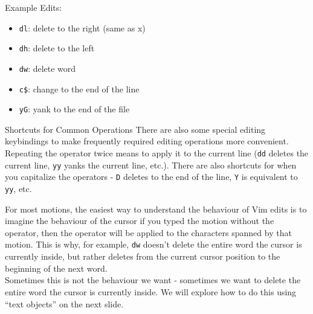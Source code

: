 \documentclass{beamer}
\begin{document}
\begin{frame}[fragile]
    Example Edits:
    \begin{itemize}
	\item \verb+dl+:  delete to the right (same as x)
	\item \verb+dh+:  delete to the left
	\item \verb+dw+:  delete word
	\item \verb+c$+:  change to the end of the line
	\item \verb+yG+:  yank to the end of the file
    \end{itemize}
\end{frame}

\begin{frame}[fragile]
    \begin{block}{Shortcuts for Common Operations}
	There are also some special editing keybindings to make frequently required editing operations more convenient. Repeating the operator twice means to apply it to the current line (\verb+dd+ deletes the current line, \verb+yy+ yanks the current line, etc.). There are also shortcuts for when you capitalize the operators - \verb+D+ deletes to the end of the line, \verb+Y+ is equivalent to \verb+yy+, etc.
    \end{block}
\end{frame}

\begin{frame}[fragile]
    For most motions, the easiest way to understand the behaviour of Vim edits is to imagine the behaviour of the cursor if you typed the motion without the operator, then the operator will be applied to the characters spanned by that motion. This is why, for example, \verb+dw+ doesn't delete the entire word the cursor is currently inside, but rather deletes from the current cursor position to the beginning of the next word.\\
    \vspace{0.5cm}
    Sometimes this is not the behaviour we want - sometimes we want to delete the entire word the cursor is currently inside. We will explore how to do this using \enquote{text objects} on the next slide.
\end{frame}
\end{document}
